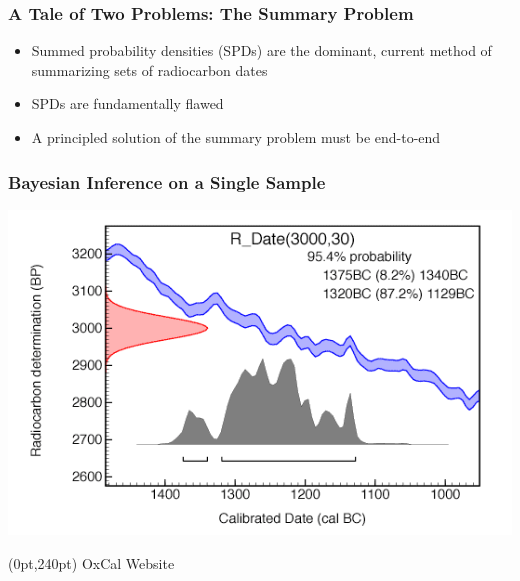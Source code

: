 \documentclass{beamer}
\begin{document}
\begin{frame}[t]
  \frametitle{A Tale of Two Problems: The Summary Problem}
  \pause
  \begin{itemize}
    \item Summed probability densities (SPDs) are the dominant, current method of summarizing sets of radiocarbon dates
    \pause
    \item SPDs are fundamentally flawed
    \pause
    \item A principled solution of the summary problem must be end-to-end
  \end{itemize}
\end{frame}

\begin{frame}[t]
  \frametitle{Bayesian Inference on a Single Sample}
    \begin{center}
      \includegraphics[height=.8\textheight]{calibration.png}
	\begin{textblock*}{100pt}(0pt,240pt)
      		\small OxCal Website \normalsize
	\end{textblock*}
    \end{center}
\end{frame}
\end{document}
